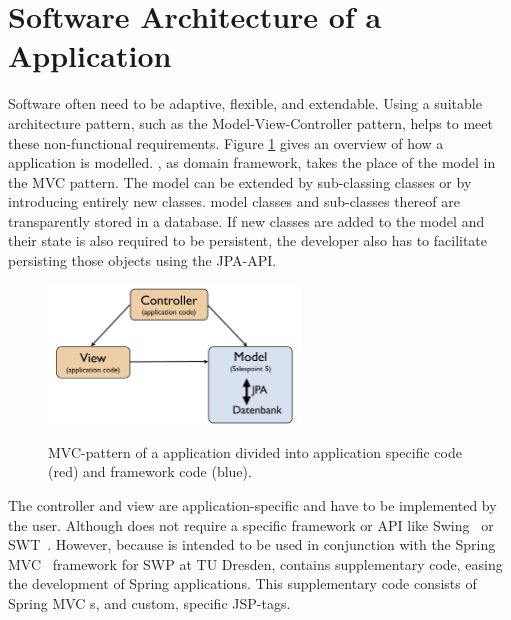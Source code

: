 \section{Software Architecture of a \salespoint{} Application}
Software often need to be adaptive, flexible, and extendable.
Using a suitable architecture pattern, such as the Model-View-Controller pattern, helps to meet these non-functional requirements.
Figure \ref{sp5-arch} gives an overview of how a \salespoint{} application is modelled.
\salespoint{}, as domain framework, takes the place of the model in the MVC pattern.
The model can be extended by sub-classing \salespoint{} classes or by introducing entirely new classes.
\salespoint{} model classes and sub-classes thereof are transparently stored in a database.
If new classes are added to the model and their state is also required to be persistent, the developer also has to facilitate persisting those objects using the JPA-API.

\begin{figure}[ht]
	\centering
  \includegraphics[width=0.6\textwidth]{images/sp5-arch.pdf}
	\label{sp5-arch}
	\caption{MVC-pattern of a \salespoint{} application divided into application specific code (red) and framework code (blue).}
\end{figure}

The controller and view are application-specific and have to be implemented by the user.
Although \salespoint{} does not require a specific framework or API like Swing~\cite{swing} or SWT~\cite{swt}.
However, because \salespoint{} is intended to be used in conjunction with the Spring MVC~\cite{spring} framework for SWP at TU Dresden, \salespoint{} contains supplementary code, easing the development of Spring applications.
This supplementary code consists of Spring MVC s, and custom, \salespoint{} specific JSP-tags.
\\

